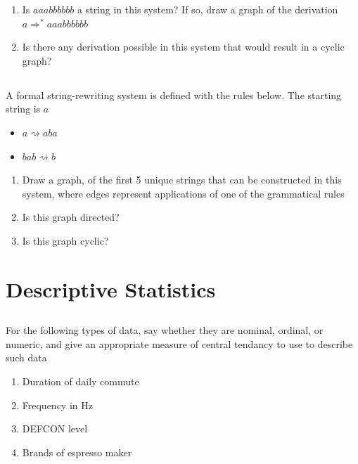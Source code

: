 \documentclass[twocolumn]{article}
\begin{document}
    \begin{enumerate}
        \item Is $aaabbbbbb$ a string in this system? If so, draw a graph of the derivation $a \Rightarrow^* aaabbbbbb$
        \item Is there any derivation possible in this system that would result in a cyclic graph?
    \end{enumerate} 

\subsection{}

    A formal string-rewriting system is defined with the rules below. The starting string is $a$
    
    \begin{itemize}
        \item $ a \rightsquigarrow aba $
        \item $bab \rightsquigarrow b$
    \end{itemize} 

    \begin{enumerate}
        \item Draw a graph, of the first 5 unique strings that can be constructed in this system, where edges represent applications of one of the  grammatical rules
        \item Is this graph directed?
        \item Is this graph cyclic?
    \end{enumerate}

\clearpage
\section{Descriptive Statistics}

\subsection{}

    For the following types of data, say whether they are nominal, ordinal, or numeric, and give an appropriate measure of central tendancy to use to describe such data

    \begin{enumerate}
        \item Duration of daily commute
        \item Frequency in Hz
        \item DEFCON level
        \item Brands of espresso maker
    \end{enumerate}
\end{document}
